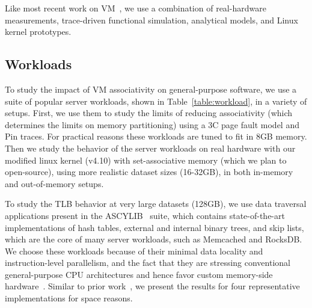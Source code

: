 Like most recent work on VM~\cite{basu:efficient, pham:increasing, pham:colt, bhattacharjee:large-reach, barr:spectlb, papadopoulou:prediction-based, saulsbury:recently-based}, we use a combination of real-hardware measurements, trace-driven functional simulation, analytical models, and Linux kernel prototypes.

\subsection{Workloads}
To study the impact of VM associativity on general-purpose software,
we use a suite of popular server workloads, shown in
Table~\ref{table:workload}, in a variety of setups. First, we use them
to study the limits of reducing associativity (which determines the
limits on memory partitioning) using a 3C page fault model and Pin
traces. For practical reasons these workloads are tuned to fit in 8GB
memory. Then we study the behavior of the server workloads on real
hardware with our modified linux kernel (v4.10) with set-associative
memory (which we plan to open-source), using more realistic dataset
sizes (16-32GB), in both in-memory and out-of-memory setups.

To study the TLB behavior at very large datasets (128GB), we use  data traversal applications present in the ASCYLIB~\cite{david:asynchronized} suite, which contains state-of-the-art implementations of hash tables, external and internal binary trees, and skip lists, which are the core of many server workloads, such as Memcached and RocksDB. We choose these workloads because of their minimal data locality and instruction-level parallelism, and the fact that they are stressing conventional general-purpose CPU architectures and hence favor custom memory-side hardware~\cite{ haria:devirtualizing, picorel:near-memory, kocberber:meet, hsieh:accelerating}. Similar to prior work~\cite{picorel:near-memory}, we present the results for four representative implementations for space reasons. 



